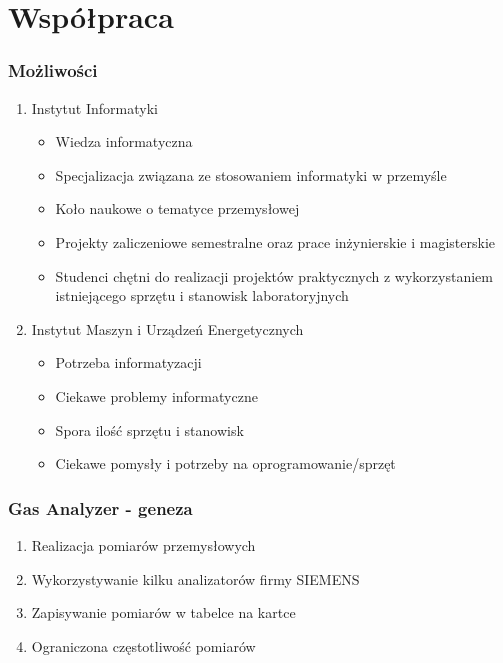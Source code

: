 \documentclass[ucs]{beamer}
\begin{document}
\section{Współpraca}
\begin{frame}
\frametitle{Możliwości}
\begin{enumerate}
\setlength{\itemsep}{3pt}
\setlength{\parskip}{3pt}
\setlength{\parsep}{3pt}
\item Instytut Informatyki
\begin{itemize}
\setlength{\itemsep}{2pt}
\setlength{\parskip}{2pt}
\setlength{\parsep}{2pt}
\item Wiedza informatyczna
\item Specjalizacja związana ze stosowaniem informatyki w przemyśle
\item Koło naukowe o tematyce przemysłowej
\item Projekty zaliczeniowe semestralne oraz prace inżynierskie i magisterskie
\item Studenci chętni do realizacji projektów praktycznych z wykorzystaniem istniejącego sprzętu i stanowisk laboratoryjnych
\end{itemize} 
\item Instytut Maszyn i Urządzeń Energetycznych
\begin{itemize}
\setlength{\itemsep}{2pt}
\setlength{\parskip}{2pt}
\setlength{\parsep}{2pt}
\item Potrzeba informatyzacji
\item Ciekawe problemy informatyczne
\item Spora ilość sprzętu i stanowisk
\item Ciekawe pomysły i potrzeby na oprogramowanie/sprzęt
\end{itemize}
\end{enumerate}
\end{frame}

\begin{frame}
\frametitle{Gas Analyzer - geneza}
\begin{enumerate}
\setlength{\itemsep}{5pt}
\setlength{\parskip}{5pt}
\setlength{\parsep}{5pt}
\item Realizacja pomiarów przemysłowych
\item Wykorzystywanie kilku analizatorów firmy SIEMENS
\item Zapisywanie pomiarów w tabelce na kartce
\item Ograniczona częstotliwość pomiarów
\end{enumerate}
\end{frame}
\end{document}
